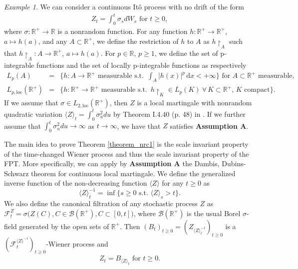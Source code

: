\documentclass[aop]{imsart}
\theoremstyle{plain}
\theoremstyle{remark}
\newtheorem*{example}{Example}
\newcommand{\reels}{\mathbb{R}}
\begin{document}
\begin{example}
We can consider a continuous It\^{o} process with no drift of the form 
\begin{eqnarray}
\label{Xdef}
Z_t = \int_0^t \sigma_s dW_s \text{ for } t \geq 0,
\end{eqnarray}
where $\sigma : \reels^+ \rightarrow \reels $ is a nonrandom function. For any function $h:  \reels^+ \rightarrow  \reels^+$, $a \mapsto h(a)$, and any $A \subset \reels^+$, we define the restriction of $h$ to $A$ as $h \restriction_A$ such that $h \restriction_A:  A \rightarrow  \reels^+$, $ a \mapsto h(a)$. For  $p \in \reels$, $p \geq 1$, we define the set of p-integrable functions and the set of locally p-integrable functions as respectively
\begin{eqnarray*}
L_{p}(A) & =& \bigl\{h:A\to\reels^+ \text{ measurable s.t. }\,\int_A | h(x)|^p \,\mathrm{d}x <+\infty\bigr\} \text{ for } A \subset \reels^+  \text{ measurable},\\
L_{p,\mathrm{loc}}(\reels^+) & =& \bigl\{h:\reels^+\to\reels^+ \text{ measurable s.t. }\,h \restriction_K \in L_p(K)\ \forall\, K \subset \reels^+,\, K \text{ compact}\bigr\}.
\end{eqnarray*}
If we assume that $\sigma \in L_{2,\mathrm{loc}}(\reels^{+})$, then $Z$ is a local martingale with nonrandom quadratic variation $\langle Z\rangle_{t} = \int_0^t \sigma_u^2 du$ by Theorem I.4.40 (p. 48) in \cite{JacodLimit2003}. If we further assume that $\int_0^t \sigma_u^2 du \rightarrow \infty$ as $t \rightarrow \infty$, we have that $Z$ satisfies \textbf{Assumption A}.
\end{example}
\noindent The main idea to prove Theorem \ref{theorem_nrc1} is the scale invariant property of the time-changed Wiener process and thus the scale invariant property of the FPT. More specifically, we can apply by \textbf{Assumption A} the Dambis, Dubins-Schwarz theorem for continuous local martingale. We define the generalized inverse function of the non-decreasing function $\langle Z\rangle$ for any $t \geq0$ as 
$$\langle Z\rangle_{t}^{-1}=\inf\{s \geq 0 \text{ s.t. }\langle Z\rangle_{s}>t\}.$$ 
We also define the canonical filtration of any stochastic process $Z$ as $\mathcal{F}_t^Z = \sigma \big(Z(C), C \in \mathcal{B}(\reels^+), C \subset [0,t] \big)$, where $\mathcal{B}(\reels^+)$ is the usual Borel $\sigma$-field generated by the open sets of $\reels^+$. Then $(B_{t})_{t\geq 0}=(Z_{\langle Z\rangle_{t}^{-1}})_{t\geq 0}$ is a $({\mathcal {F}}_t^{\langle Z\rangle^{-1}})_{t\geq 0}$-Wiener process and 
\begin{eqnarray}
\label{proof230110}
Z_{t}=B_{\langle Z\rangle_{t}} \text{ for } t \geq 0.
\end{eqnarray}
\end{document}

